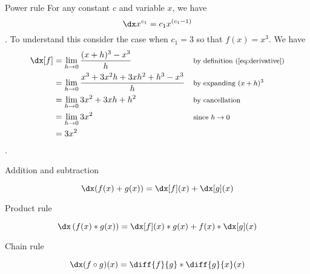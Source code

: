 \begin{psec}{Power rule}\label{rule:derivative powers} For any constant $c$ and
    variable $x$, we have
    \begin{equation}\label{eq:derivative power}
        \dx x^{c_1} = c_1 x^{(c_1 - 1)}
    \end{equation}
    . To understand this consider the case when $c_1=3$ so that $f(x) = x^3$. We have
    \begin{align*}
        \dx[f] &= \lim_{h\rightarrow 0} \frac{(x + h)^3 - x^3}{h} & &
        \text{\footnotesize by definition (\ref{eq:derivative})}\\
               &= \lim_{h\rightarrow 0} \frac{x^3 +3x^2h + 3xh^2 + h^3 -
               x^3}{h} & & \text{\footnotesize by expanding $(x + h)^3$}\\
               &= \lim_{h\rightarrow 0} 3x^2 + 3xh + h^2 & &
               \text{\footnotesize by cancellation}\\
               &= \lim_{h\rightarrow 0} 3x^2 & & \text{\footnotesize since $h\rightarrow 0$} \\
               &= 3x^2 & \text{}
    \end{align*}.

\end{psec}

\begin{psec}{Addition and subtraction}\label{rule:derivative add}

    \begin{equation}\label{eq:derivative add}
        \dx (f(x) + g(x)) = \dx[f](x) + \dx[g](x)
    \end{equation}

\end{psec}

\begin{psec}{Product rule}\label{rule:derivative product}

    \begin{equation}\label{eq:derivative prod}
        \dx \left(f(x)*g(x)\right) = \dx[f](x) *  g(x) + f(x) *
        \dx[g](x)
    \end{equation}

\end{psec}

\begin{psec}{Chain rule}\label{rule:derivative chain}

    \begin{equation}\label{eq:derivative chain}
        \dx (f \circ g)(x) = \diff{f}{g} * \diff{g}{x}(x)
    \end{equation}

\end{psec}

